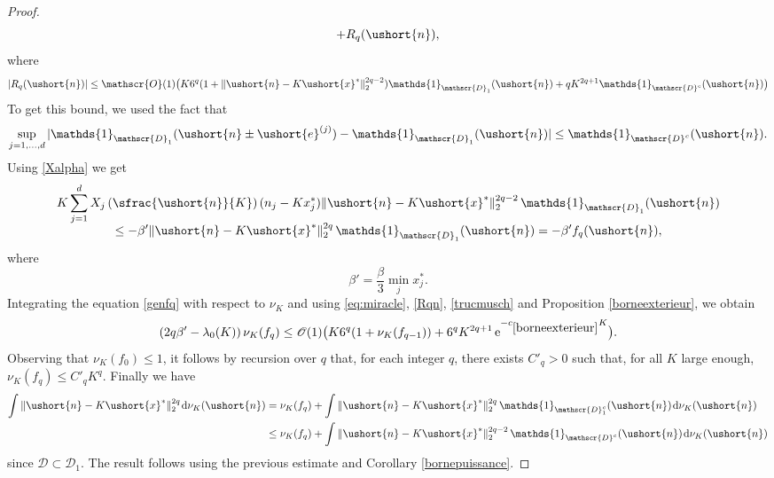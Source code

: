 \documentclass[10pt]{amsart}
\newcommand{\scaleto}[2]{#1}
\let\mathcal\mathscr
\numberwithin{equation}{section}
\theoremstyle{plain}
\theoremstyle{definition}
\newcommand{\pcte}[1]{c_{\eqref{#1}}}
\newcommand{\Oun}{\mathcal{O}(1)}
\newcommand{\un}{\mathds{1}}
\newcommand{\vecn}{\ushort{n}}
\newcommand{\vecxf}{\ushort{x}^*}
\newcommand{\vece}[1]{\ushort{e}^{(#1)}}
\newcommand{\nuk}{\nu_{K}}\let\snuk\nuk
\newcommand{\e}{\operatorname{e}}
\newcommand{\dd}{\hspace{1pt}\mathrm{d}}
\begin{document}
\begin{proof}
\begin{equation}
+R_q(\vecn),
\end{equation}
where
\begin{equation}\label{Rqn}
|R_q(\vecn)|\leq \Oun\bigl(K 6^q (1+\|\vecn-K\vecxf\|_{2}^{\scaleto{2q-2}{5.3pt}}) \un_{\mathcal{D}_1}(\vecn) + q K^{2q+1} \un_{\mathcal{D}^c}(\vecn)\bigr)
\end{equation}
To get this bound, we used the fact that
\[
\sup_{j=1,\ldots, d} |\un_{\mathcal{D}_1}(\vecn\pm \vece{j})-\un_{\mathcal{D}_1}(\vecn)|\leq \un_{\mathcal{D}^c}(\vecn).
\]
Using \eqref{Xalpha} we get
\begin{multline}\label{trucmusch}
K \sum_{j=1}^d X_j\left(\sfrac{\vecn}{K}\right) (n_j-Kx_j^*) \|\vecn - K\vecxf\|_{2}^{\scaleto{2q-2}{5.3pt}} \,\un_{\mathcal{D}_1}(\vecn)\\[-5pt]
\leq -\beta' \|\vecn - K\vecxf\|_{2}^{\scaleto{2q}{5.3pt}} \,\un_{\mathcal{D}_1}(\vecn) = -\beta' f_q(\vecn),
\end{multline}
where
\[
\beta'= \frac{\beta}{3} \min_j x_j^*.
\]
Integrating the equation \eqref{genfq} with respect to $\nuk$ and using \eqref{eq:miracle}, \eqref{Rqn}, \eqref{trucmusch} and Proposition \ref{borneexterieur},
we obtain
\[
(2q\beta'-\lambda_0(K))\,\nuk(f_q)\leq \Oun\bigl(K 6^q(1+\nuk(f_{q-1}))+ 6^q K^{2q+1} \e^{-\pcte{borneexterieur} K}\bigr).
\]
Observing that $\nuk(f_0)\leq 1$, it follows by recursion over $q$ that, for each integer $q$, there exists $C'_q>0$
such that, for all $K$ large enough, $\nuk(f_q)\leq C'_q K^q$. Finally we have
\begin{align*}
\int \|\vecn-K\vecxf\|_{2}^{\scaleto{2q}{5.3pt}} \dd\nuk(\vecn)
& = \nuk(f_q) +\int \|\vecn-K\vecxf\|_{2}^{\scaleto{2q}{5.3pt}}\,\un_{\mathcal{D}_1^c}(\vecn) \dd\nuk(\vecn)\\
& \leq \nuk(f_q) +\int\|\vecn-K\vecxf\|_{2}^{\scaleto{2q-2}{5.3pt}}\,\un_{\mathcal{D}^c}(\vecn)\dd\nuk(\vecn)
\end{align*}
since $\mathcal{D}\subset \mathcal{D}_1$.
The result follows using the previous estimate and Corollary \ref{bornepuissance}.
\end{proof}
\end{document}
